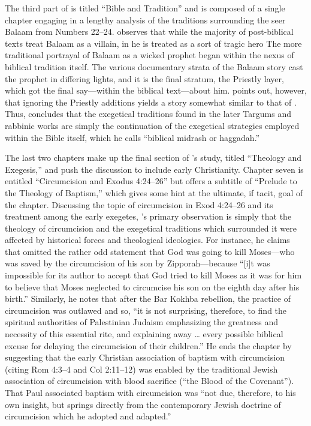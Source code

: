 The third part of  is titled ``Bible and Tradition'' and is composed of a single chapter engaging in a lengthy analysis of the traditions surrounding the seer Balaam from Numbers 22--24. \vermes observes that while the majority of post-biblical texts treat Balaam as a villain, in \lab he is treated as a sort of tragic hero%
    \autocite[173]{vermes1961}
The more traditional portrayal of Balaam as a wicked prophet began within the nexus of biblical tradition itself. The various documentary strata of the Balaam story cast the prophet in differing lights, and it is the final stratum, the Priestly layer, which got the final say---within the biblical text---about him.
%
%
\vermes points out, however, that ignoring the Priestly additions yields a story somewhat similar to that of \lab. Thus, \vermes concludes that the exegetical traditions found in the later Targums and rabbinic works are simply the continuation of the exegetical strategies employed within the Bible itself, which he calls ``biblical midrash or haggadah.''%
    \autocite[176]{vermes1961}

The last two chapters make up the final section of \vermes's study, titled ``Theology and Exegesis,'' and push the discussion to include early Christianity. Chapter seven is entitled ``Circumcision and Exodus 4:24--26'' but offers a subtitle of ``Prelude to the Theology of Baptism,'' which gives some hint at the ultimate, if tacit, goal of the chapter. Discussing the topic of circumcision in Exod 4:24--26 and its treatment among the early exegetes, \vermes's primary observation is simply that the theology of circumcision and the exegetical traditions which surrounded it were affected by historical forces and theological ideologies. For instance, he claims that \jub omitted the rather odd statement that God was going to kill Moses---who was saved by the circumcision of his son by Zipporah---because ``[i]t was impossible for its author to accept that God tried to kill Moses as it was for him to believe that Moses neglected to circumcise his son on the eighth day after his birth.''%
    \autocite[185]{vermes1961}
Similarly, he notes that after the Bar Kokhba rebellion, the practice of circumcision was outlawed and so, ``it is not surprising, therefore, to find the spiritual authorities of Palestinian Judaism emphasizing the greatness and necessity of this essential rite, and explaining away \ldots{} every possible biblical excuse for delaying the circumcision of their children.''%
    \autocite[189]{vermes1961}
He ends the chapter by suggesting that the early Christian association of baptism with circumcision (citing Rom 4:3--4 and Col 2:11--12) was enabled by the traditional Jewish association of circumcision with blood sacrifice (``the Blood of the Covenant'').%
    \autocite[190]{vermes1961}
That Paul associated baptism with circumcision was ``not due, therefore, to his own insight, but springs directly from the contemporary Jewish doctrine of circumcision which he adopted and adapted.''%
    \autocite[191]{vermes1961} 

